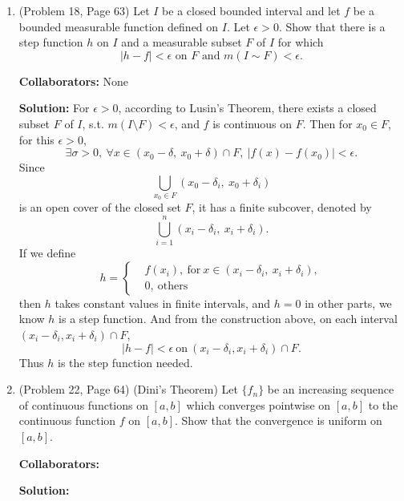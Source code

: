 \documentclass{article}%
\begin{document}
\begin{enumerate}
\item  (Problem 18, Page 63) Let $I$ be a closed bounded interval and let $f$ be a bounded measurable function defined on $I$. Let $\epsilon > 0$.  Show that there is a step function $h$ on $I$ and a measurable subset $F$ of $I$ for which \[
|h-f|< \epsilon \text{ on } F \text{ and } m(I\sim F)< \epsilon .\]


\bigskip
\textbf{Collaborators:} None
\smallskip
 
\textbf{Solution:}
For $\epsilon > 0$, according to Lusin's Theorem, there exists a closed subset $F$ of $I$, s.t. $m(I\setminus F) < \epsilon$, and $f$ is continuous on $F$.
Then for $x_0\in F$, for this $\epsilon > 0$, 
$$
\exists \sigma > 0, ~\forall x\in (x_0-\delta, ~x_0+\delta)\cap F, ~|f(x)-f(x_0)| < \epsilon.
$$
Since
$$
\bigcup_{x_0\in F} (x_0-\delta_i, ~x_0+\delta_i)
$$
is an open cover of the closed set $F$, it has a finite subcover, denoted by
$$
\bigcup_{i=1}^n (x_i-\delta_i, ~x_i+\delta_i).
$$
If we define
$$
h = \left\{
\begin{aligned}
&f(x_i), ~\text{for} ~x\in (x_i-\delta_i, ~x_i+\delta_i), \\
&0, ~\text{others}
\end{aligned}
\right.
$$
then $h$ takes constant values in finite intervals, and $h = 0$ in other parts, we know $h$ is a step function. And from the construction above, on each interval $(x_i-\delta_i, x_i+\delta_i)\cap F$, 
$$
|h-f|< \epsilon ~\text{on}~ (x_i-\delta_i, x_i+\delta_i)\cap F.
$$
Thus $h$ is the step function needed.

\bigskip

\item (Problem 22, Page 64) (Dini's Theorem)  Let $\{f_n\}$ be an increasing sequence of continuous functions on $[a,b]$ which converges pointwise on $[a,b]$ to the continuous function $f$ on $[a,b]$.  Show that the convergence is uniform on $[a,b]$.


\bigskip
\textbf{Collaborators:}\\
\smallskip
 
\textbf{Solution:}
\bigskip




\end{enumerate}
\end{document}
